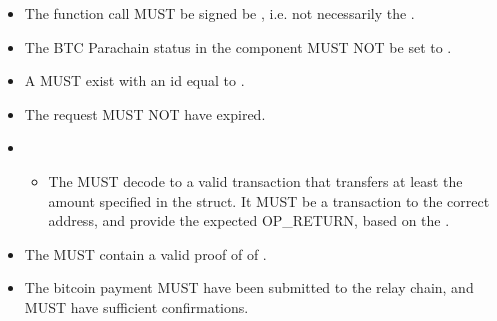 \documentclass[a4paper,10pt,english]{sphinxmanual}
\begin{document}
\begin{itemize}
\item {} 
The function call MUST be signed be , i.e. not necessarily the .

\item {} 
The BTC Parachain status in the {\hyperref[\detokenize{spec/security:security}]{}} component MUST NOT be set to .

\item {} 
A   MUST exist with an id equal to .

\item {} 
The request MUST NOT have expired.

\item {} \begin{itemize}
\item {} 
The  MUST decode to a valid transaction that transfers at least the amount specified in the  struct. It MUST be a transaction to the correct address, and provide the expected OP\_RETURN, based on the .

\end{itemize}

\item {} 
The  MUST contain a valid proof of of .

\item {} 
The bitcoin payment MUST have been submitted to the relay chain, and MUST have sufficient confirmations.

\end{itemize}
\end{document}
